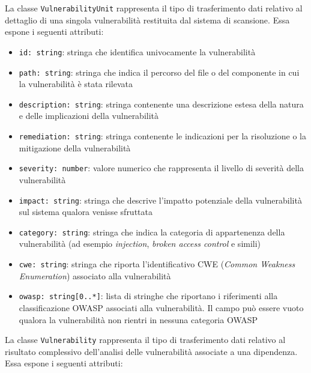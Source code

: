 \documentclass[a4paper, 11pt]{article}
\newcounter{subsubsubsection}[subsubsection]
\begin{document}
\label{sec:VulnerabilityUnit}
 
La classe \texttt{VulnerabilityUnit} rappresenta il tipo di trasferimento dati relativo al dettaglio
di una singola vulnerabilità restituita dal sistema di scansione. Essa espone i seguenti attributi:
 
\begin{itemize}
  \item \texttt{id: string}: stringa che identifica univocamente la vulnerabilità
 
  \item \texttt{path: string}: stringa che indica il percorso del file o del componente in cui la
    vulnerabilità è stata rilevata
 
  \item \texttt{description: string}: stringa contenente una descrizione estesa della natura e
    delle implicazioni della vulnerabilità
 
  \item \texttt{remediation: string}: stringa contenente le indicazioni per la risoluzione o la
    mitigazione della vulnerabilità
 
  \item \texttt{severity: number}: valore numerico che rappresenta il livello di severità della
    vulnerabilità
 
  \item \texttt{impact: string}: stringa che descrive l'impatto potenziale della vulnerabilità
    sul sistema qualora venisse sfruttata
 
  \item \texttt{category: string}: stringa che indica la categoria di appartenenza della
    vulnerabilità (ad esempio \textit{injection}, \textit{broken access control} e simili)
 
  \item \texttt{cwe: string}: stringa che riporta l'identificativo CWE (\textit{Common Weakness
    Enumeration}) associato alla vulnerabilità
 
  \item \texttt{owasp: string[0..*]}: lista di stringhe che riportano i riferimenti alla
    classificazione OWASP associati alla vulnerabilità. Il campo può essere vuoto qualora la
    vulnerabilità non rientri in nessuna categoria OWASP
\end{itemize} 

\label{sec:Vulnerability}
 
La classe \texttt{Vulnerability} rappresenta il tipo di trasferimento dati relativo al risultato
complessivo dell'analisi delle vulnerabilità associate a una dipendenza. Essa espone i seguenti
attributi:
 
\end{document}
